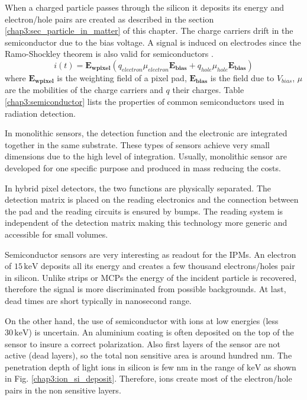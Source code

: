 \begin{refsection}
  When a charged particle passes through the silicon it deposits its energy and electron/hole pairs are created as described in the section \ref{chap3:sec_particle_in_matter} of this chapter. The charge carriers drift in the semiconductor due to the bias voltage. 
  A signal is induced on electrodes since the Ramo-Shockley theorem is also valid for semiconductors \cite{Cavalleri1971}.
  \begin{equation}
    i(t) =  \boldsymbol{E_{wpixel}} \left( q_{electron} \mu_{electron} \boldsymbol{E_{bias}} + q_{hole} \mu_{hole} \boldsymbol{E_{bias}} \right)
  \end{equation}
  where $\boldsymbol{E_{wpixel}}$ is the weighting field of a pixel pad, $\boldsymbol{E_{bias}}$ is the field due to $V_{bias}$, $\mu$ are the mobilities of the charge carriers and $q$ their charges.
  Table \ref{chap3:semiconductor} lists the properties of common semiconductors used in radiation detection. 

  

  In monolithic sensors, the detection function and the electronic are integrated together in the same substrate. These types of sensors achieve very small dimensions due to the high level of integration. Usually, monolithic sensor are developed for one specific purpose and produced in mass reducing the costs. 

  In hybrid pixel detectors, the two functions are physically separated. The detection matrix is ​​placed on the reading electronics and the connection between the pad and the reading circuits is ensured by bumps. The reading system is independent of the detection matrix making this technology more generic and accessible for small volumes. 

  Semiconductor sensors are very interesting as readout for the IPMs. An electron of $15\,\mathrm{keV}$ deposits all its energy and creates a few thousand electrons/holes pair in silicon. Unlike strips or MCPs the energy of the incident particle is recovered, therefore the signal is more discriminated from possible backgrounds. At last, dead times are short typically in nanosecond range.

  On the other hand, the use of semiconductor with ions at low energies (less $30 \,\mathrm{keV}$) is uncertain. An aluminium coating is often deposited on the top of the sensor to insure a correct polarization. Also first layers of the sensor are not active (dead layers), so the total non sensitive area is around hundred $\mathrm{nm}$. The penetration depth of light ions in silicon is few $\mathrm{nm}$ in the range of $\mathrm{keV}$ as shown in Fig. \ref{chap3:ion_si_deposit}. Therefore, ions create most of the electron/hole pairs in the non sensitive layers.


\end{refsection}
